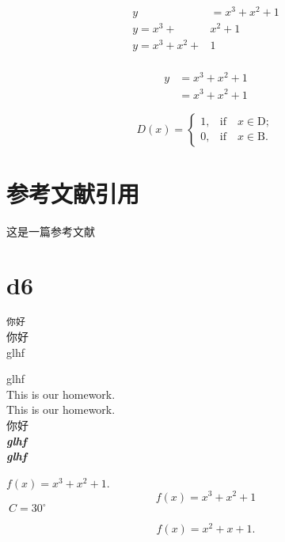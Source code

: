 \documentclass{article}
\newcommand\degree{^\circ}
\begin{document}
	\begin{align} %
	y &= x^3 + x^2 + 1\\
	y = x^3 + &x^2 + 1\\
	y = x^3 + x^2 + &1\\
	\end{align}

	\begin{equation}
		\begin{split}
			y &= x^3 + x^2 + 1\\
			&=x^3 + x^2 + 1
		\end{split}
	\end{equation}

	\begin{equation}
		D(x)=\begin{cases}
			1,&\text{if} \quad x \in \text{D};\\
			0,&\text{if} \quad x \in \text{B}.
		\end{cases}
	\end{equation}
	\section{参考文献引用}
	这是一篇参考文献\cite{Lu2018Single}
	
	\nocite{*}
	
	
	\section{d6}
	 
	\texttt{你好}\\
	\textsf{你好}\\
	
	{\rmfamily glhf}\\ \par{\ttfamily glhf}\\
	{\tiny This is our homework.}\\
	{\normalsize This is our homework.}\\
	 你好\\
	\emph{\textit{\textbf{glhf}}}\\
	\textit{\textbf{glhf}}
	\quad %
	
	$f(x)=x^3+x^2+1$.
	$$f(x)=x^3+x^2+1$$
	$\ C=30\degree$
	
	\begin{equation}
		f(x)=x^2+x+1.
	\end{equation}
\end{document}
